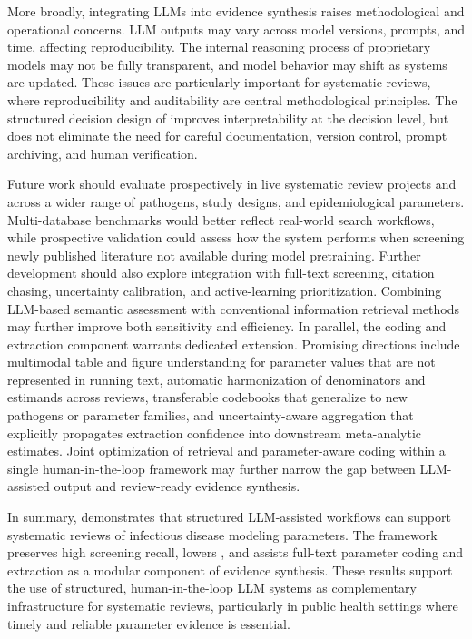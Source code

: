 More broadly, integrating LLMs into evidence synthesis raises methodological and operational concerns. LLM outputs may vary across model versions, prompts, and time, affecting reproducibility. The internal reasoning process of proprietary models may not be fully transparent, and model behavior may shift as systems are updated. These issues are particularly important for systematic reviews, where reproducibility and auditability are central methodological principles. The structured decision design of \metagent{} improves interpretability at the decision level, but does not eliminate the need for careful documentation, version control, prompt archiving, and human verification.

Future work should evaluate \metagent{} prospectively in live systematic review projects and across a wider range of pathogens, study designs, and epidemiological parameters. Multi-database benchmarks would better reflect real-world search workflows, while prospective validation could assess how the system performs when screening newly published literature not available during model pretraining. Further development should also explore integration with full-text screening, citation chasing, uncertainty calibration, and active-learning prioritization. Combining LLM-based semantic assessment with conventional information retrieval methods may further improve both sensitivity and efficiency. In parallel, the coding and extraction component warrants dedicated extension. Promising directions include multimodal table and figure understanding for parameter values that are not represented in running text, automatic harmonization of denominators and estimands across reviews, transferable codebooks that generalize to new pathogens or parameter families, and uncertainty-aware aggregation that explicitly propagates extraction confidence into downstream meta-analytic estimates. Joint optimization of retrieval and parameter-aware coding within a single human-in-the-loop framework may further narrow the gap between LLM-assisted output and review-ready evidence synthesis.

In summary, \metagent{} demonstrates that structured LLM-assisted workflows can support systematic reviews of infectious disease modeling parameters. The framework preserves high screening recall, lowers \nns{}, and assists full-text parameter coding and extraction as a modular component of evidence synthesis. These results support the use of structured, human-in-the-loop LLM systems as complementary infrastructure for systematic reviews, particularly in public health settings where timely and reliable parameter evidence is essential.

